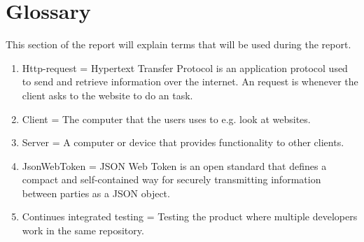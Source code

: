 \documentclass[paper=a4, fontsize=11pt,twoside]{scrartcl}	%
\begin{document}
\newpage

\section{Glossary}
This section of the report will explain terms that will be used during the report. 
\begin{enumerate}
\item Http-request = Hypertext Transfer Protocol is an application protocol used to send and retrieve information over the internet. An request is whenever the client asks to the website to do an task.
\item Client = The computer that the users uses to e.g. look at websites.
\item Server = A computer or device that provides functionality to other clients.
\item JsonWebToken = JSON Web Token is an open standard that defines a compact and self-contained way for securely transmitting information between parties as a JSON object.
\item Continues integrated testing = Testing the product where multiple developers work in the same repository.
\end{enumerate}


\newpage
\end{document}

